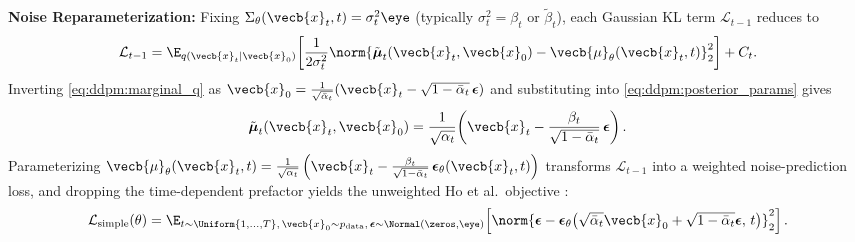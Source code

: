 \documentclass[../../../../master.tex]{subfiles}
\begin{document}
\begin{coremath}
\textbf{Noise Reparameterization:} Fixing $\Sigma_\theta(\vecb{x}_t, t) = \sigma_t^2 \eye$ (typically $\sigma_t^2 = \beta_t$ or $\tilde{\beta}_t$), each Gaussian KL term $\mathcal{L}_{t-1}$ reduces to
\begin{equation}\label{eq:ddpm:kl_mse}
  \mathcal{L}_{t-1} = \E_{q(\vecb{x}_t \mid \vecb{x}_0)}\!\left[\frac{1}{2\sigma_t^2}\norm{\tilde{\boldsymbol{\mu}}_t(\vecb{x}_t, \vecb{x}_0) - \vecb{\mu}_\theta(\vecb{x}_t, t)}_2^2\right] + C_t.
\end{equation}
Inverting \eqref{eq:ddpm:marginal_q} as $\vecb{x}_0 = \frac{1}{\sqrt{\bar{\alpha}_t}}(\vecb{x}_t - \sqrt{1 - \bar{\alpha}_t}\,\boldsymbol{\epsilon})$ and substituting into \eqref{eq:ddpm:posterior_params} gives
\begin{equation}\label{eq:ddpm:mu_eps}
  \tilde{\boldsymbol{\mu}}_t(\vecb{x}_t, \vecb{x}_0) = \frac{1}{\sqrt{\alpha_t}}\!\left(\vecb{x}_t - \frac{\beta_t}{\sqrt{1 - \bar{\alpha}_t}}\,\boldsymbol{\epsilon}\right).
\end{equation}
Parameterizing $\vecb{\mu}_\theta(\vecb{x}_t, t) = \frac{1}{\sqrt{\alpha_t}}\left(\vecb{x}_t - \frac{\beta_t}{\sqrt{1 - \bar{\alpha}_t}}\,\boldsymbol{\epsilon}_\theta(\vecb{x}_t, t)\right)$ transforms $\mathcal{L}_{t-1}$ into a weighted noise-prediction loss, and dropping the time-dependent prefactor yields the unweighted Ho et al.\ objective  :
\begin{equation}\label{eq:ddpm:loss_simple}
  \mathcal{L}_{\mathrm{simple}}(\theta) = \E_{t \sim \Uniform\{1,\dots,T\},\, \vecb{x}_0 \sim p_{\mathrm{data}},\, \boldsymbol{\epsilon} \sim \Normal(\zeros,\eye)}\!\left[\norm{\boldsymbol{\epsilon} - \boldsymbol{\epsilon}_\theta\!\left(\sqrt{\bar{\alpha}_t}\vecb{x}_0 + \sqrt{1 - \bar{\alpha}_t}\boldsymbol{\epsilon},\, t\right)}_2^2\right].
\end{equation}
\end{coremath}
\end{document}
